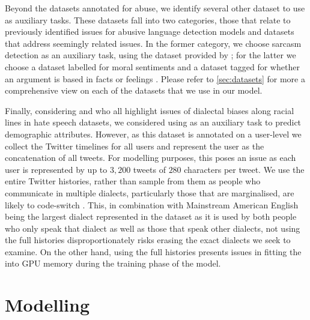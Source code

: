 Beyond the datasets annotated for abuse, we identify several other dataset to use as auxiliary tasks. These datasets fall into two categories, those that relate to previously identified issues for abusive language detection models and datasets that address seemingly related issues. In the former category, we choose sarcasm detection as an auxiliary task, using the dataset provided by \citet{Oraby_sarcasm:2016}; for the latter we choose a dataset labelled for moral sentiments \citet{Hoover:2019} and a dataset tagged for whether an argument is based in facts or feelings \citet{Oraby_factfeel:2015}. Please refer to \autoref{sec:datasets} for more a comprehensive view on each of the datasets that we use in our model.

Finally, considering \citet{Waseem:2018,Davidson:2019} and \citet{Sap:2019} who all highlight issues of dialectal biases along racial lines in hate speech datasets, we considered using \citet{Preotiuc-Unger:2018} as an auxiliary task to predict demographic attributes. However, as this dataset is annotated on a user-level we collect the Twitter timelines for all users and represent the user as the concatenation of all tweets. For modelling purposes, this poses an issue as each user is represented by up to $3,200$ tweets of $280$ characters per tweet. We use the entire Twitter histories, rather than sample from them as people who communicate in multiple dialects, particularly those that are marginalised, are likely to code-switch \cite{CITE: AAE code switching paper}. This, in combination with Mainstream American English being the largest dialect represented in the dataset as it is used by both people who only speak that dialect as well as those that speak other dialects, not using the full histories disproportionately risks erasing the exact dialects we seek to examine. On the other hand, using the full histories presents issues in fitting the into GPU memory during the training phase of the model.


\section{Modelling}

